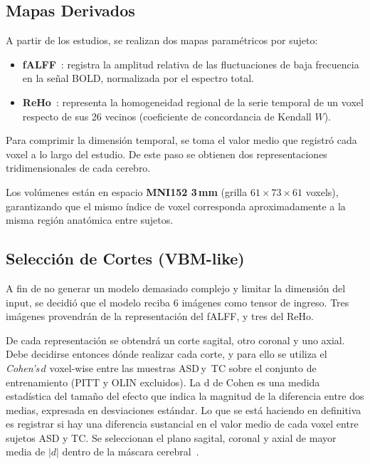 \documentclass[conference]{IEEEtran}
\begin{document}
\subsection{Mapas Derivados}

A partir de los estudios, se realizan dos mapas paramétricos por sujeto:

\begin{itemize}
  \item \textbf{fALFF}~\cite{zou2008}: registra la amplitud relativa de las
        fluctuaciones de baja frecuencia en la señal BOLD, normalizada
        por el espectro total.
  \item \textbf{ReHo}~\cite{zang2004}: representa la homogeneidad regional de la
        serie temporal de un voxel respecto de sus 26 vecinos (coeficiente
        de concordancia de Kendall $W$).
\end{itemize}

Para comprimir la dimensión temporal, se toma el valor medio que registró cada voxel a lo largo del estudio. De este paso se obtienen dos representaciones tridimensionales de cada cerebro.

Los volúmenes están en espacio \textbf{MNI152 3\,mm} (grilla
$61{\times}73{\times}61$ voxels), garantizando que el mismo índice de
voxel corresponda aproximadamente a la misma región anatómica entre
sujetos.

\subsection{Selección de Cortes (VBM-like)}

A fin de no generar un modelo demasiado complejo y limitar la dimensión del input, se decidió que el modelo reciba 6 imágenes como tensor de ingreso. Tres imágenes provendrán de la representación del fALFF, y tres del ReHo.

De cada representación se obtendrá un corte sagital, otro coronal y uno axial.
Debe decidirse entonces dónde realizar cada corte, y para ello se utiliza el 
\emph{Cohen's\,$d$} voxel-wise entre las muestras ASD\,y \,TC sobre el conjunto de
entrenamiento (PITT y OLIN excluidos). La d de Cohen es una medida estadística del tamaño del efecto que indica la magnitud de la diferencia entre dos medias, expresada en desviaciones estándar. Lo que se está haciendo en definitiva es registrar si hay una diferencia sustancial en el valor medio de cada voxel entre sujetos ASD y TC. Se seleccionan el plano sagital, coronal y axial de mayor
media de $|d|$ dentro de la máscara cerebral~\cite{muellerRissman2015}.
\end{document}
